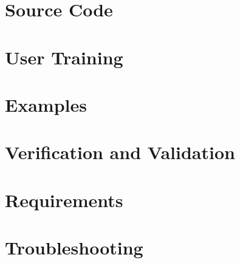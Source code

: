 \documentclass{simcenterdocumentation}
\begin{document}
\chapter{Source Code}
\label{chap:SourceCode}


\chapter{User Training}
\label{chap:training}


\chapter{Examples}
\label{chap:examples}


\chapter{Verification and Validation}
\label{chap:vnv}


\chapter{Requirements}
\label{chap:requirements}


\chapter{Troubleshooting}
\label{chap:troubleshooting}


\nocite{*}


\pagestyle{plain}
{
  \renewcommand{\thispagestyle}[1]{}	
  \printbibliography           
}
\end{document}
